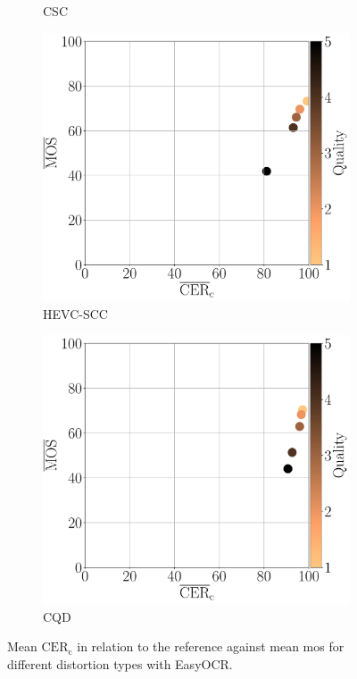 \begin{figure}[h!]
\begin{subfigure}[b]{0.3\textwidth}
        \caption{CSC}
        \label{fig:mos_cer_ref_mean_ezocr_CSC}
    \end{subfigure}
    \hfill
    \begin{subfigure}[b]{0.3\textwidth}
        \includegraphics[width=\textwidth]{../../images/analyze/mos_cer_ref_mean_ezocr_HEVC-SCC.pdf}
        \caption{HEVC-SCC}
        \label{fig:mos_cer_ref_mean_ezocr_HEVC-SCC}
    \end{subfigure}
    \hfill
    \begin{subfigure}[b]{0.3\textwidth}
        \includegraphics[width=\textwidth]{../../images/analyze/mos_cer_ref_mean_ezocr_CQD.pdf}
        \caption{CQD}
        \label{fig:mos_cer_ref_mean_ezocr_CQD}
    \end{subfigure}
\caption{Mean $\text{CER}_{\text{c}}$ in relation to the reference against mean \gls{mos} for different distortion types with EasyOCR.}
\label{fig:mos_cer_ref_mean_ezocr}
\end{figure}

